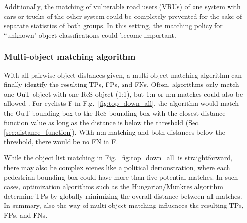 \documentclass[conference]{IEEEtran}
\begin{document}
Additionally, the matching of vulnerable road users (VRUs) of one system with cars or trucks of the other system could be completely prevented for the sake of separate statistics of both groups. 
In this setting, the matching policy for ``unknown" object classifications could become important.






\subsubsection{Multi-object matching algorithm}
\label{sec:multi_object_matching}

With all pairwise object distances given, a multi-object matching algorithm can finally identify the resulting TPs, FPs, and FNs. 
Often, algorithms only match one OuT object with one ReS object (1:1), but 1:n or n:n matches could also be allowed \cite[Sec. 11.3]{Brahmi2020diss}. 
For cyclists F in Fig.~\ref{fig:top_down_all}, the algorithm would match the OuT bounding box to the ReS bounding box with the closest distance function value as long as the distance is below the threshold (Sec. \ref{sec:distance_function}). 
With n:n matching and both distances below the threshold, there would be no FN in F.

While the object list matching in Fig.~\ref{fig:top_down_all} is straightforward, there may also be complex scenes like a political demonstration, where each pedestrian bounding box could have more than five potential matches. %
In such cases, optimization algorithms such as the Hungarian/Munkres algorithm determine TPs by globally minimizing the overall distance between all matches.
In summary, also the way of multi-object matching influences the resulting TPs, FPs, and FNs.

\end{document}
